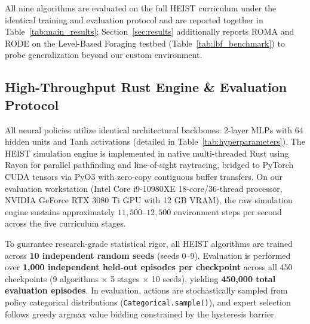 All nine algorithms are evaluated on the full HEIST curriculum under the identical training and evaluation protocol and are reported together in Table~\ref{tab:main_results}; Section~\ref{sec:results} additionally reports ROMA and RODE on the Level-Based Foraging testbed (Table~\ref{tab:lbf_benchmark}) to probe generalization beyond our custom environment.

\subsection{High-Throughput Rust Engine \& Evaluation Protocol}
All neural policies utilize identical architectural backbones: 2-layer MLPs with 64 hidden units and Tanh activations (detailed in Table~\ref{tab:hyperparameters}). The HEIST simulation engine is implemented in native multi-threaded Rust using Rayon for parallel pathfinding and line-of-sight raytracing, bridged to PyTorch CUDA tensors via PyO3 with zero-copy contiguous buffer transfers. On our evaluation workstation (Intel Core i9-10980XE 18-core/36-thread processor, NVIDIA GeForce RTX 3080 Ti GPU with 12 GB VRAM), the raw simulation engine sustains approximately $11,\!500$--$12,\!500$ environment steps per second across the five curriculum stages.

To guarantee research-grade statistical rigor, all HEIST algorithms are trained across \textbf{10 independent random seeds} (seeds 0--9). Evaluation is performed over \textbf{1,000 independent held-out episodes per checkpoint} across all 450 checkpoints (9 algorithms $\times$ 5 stages $\times$ 10 seeds), yielding \textbf{450,000 total evaluation episodes}. In evaluation, actions are stochastically sampled from policy categorical distributions (\texttt{Categorical.sample()}), and expert selection follows greedy argmax value bidding constrained by the hysteresis barrier.

